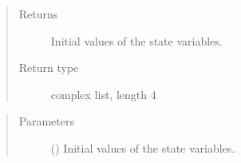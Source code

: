 \documentclass[letterpaper,10pt,english]{sphinxmanual}
\begin{document}
\begin{fulllineitems}

\begin{fulllineitems}
\label{\detokenize{model:model.im_drive.Drive.get_initial_values}}
\pysigstartsignatures
{}
\pysigstopsignatures\begin{quote}\begin{description}
\item[{Returns}] \leavevmode
\sphinxAtStartPar
{} \textendash{} Initial values of the state variables.

\item[{Return type}] \leavevmode
\sphinxAtStartPar
complex list, length 4

\end{description}\end{quote}

\end{fulllineitems}


\begin{fulllineitems}
\label{\detokenize{model:model.im_drive.Drive.set_initial_values}}
\pysigstartsignatures
{}
\pysigstopsignatures\begin{quote}\begin{description}
\item[{Parameters}] \leavevmode
\sphinxAtStartPar
{} () \textendash{} Initial values of the state variables.

\end{description}\end{quote}

\end{fulllineitems}


\end{fulllineitems}

\end{document}
